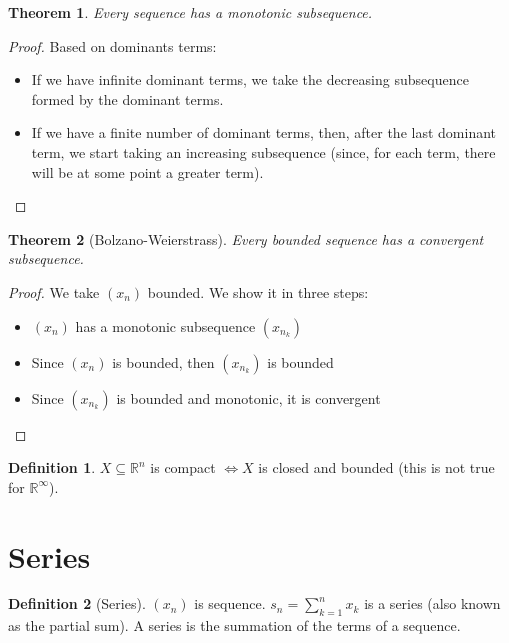 \documentclass{article}
\newcommand{\DS}{\displaystyle}
\theoremstyle{definition}
\newtheorem{definition}{Definition}[section]
\theoremstyle{definition}
\theoremstyle{plain}
\newtheorem{theorem}{Theorem}[section]
\theoremstyle{plain}
\theoremstyle{plain}
\theoremstyle{plain}
\theoremstyle{definition}
\theoremstyle{remark}
\theoremstyle{remark}
\theoremstyle{remark}
\theoremstyle{remark}
\newcommand{\R}{\mathbb{R}}
\newcommand{\sumn}{\sum_{k=1}^n}
\begin{document}
\begin{theorem}
  Every sequence has a monotonic subsequence.
\end{theorem}

\begin{proof}
  Based on dominants terms:
  \begin{itemize}
    \item If we have infinite dominant terms, we take the decreasing subsequence formed by the dominant terms.
    \item If we have a finite number of dominant terms, then, after the last dominant term, we start taking an increasing subsequence (since, for each term, there will be at some point a greater term).
  \end{itemize}
\end{proof}


\begin{theorem}[Bolzano-Weierstrass]
  Every bounded sequence has a convergent subsequence.
\end{theorem}

\begin{proof}
  We take $(x_n)$ bounded. We show it in three steps:
  \begin{itemize}
    \item $(x_n)$ has a monotonic subsequence $(x_{n_k})$
    \item Since $(x_n)$ is bounded, then $(x_{n_k})$ is bounded
    \item Since $(x_{n_k})$ is bounded and monotonic, it is convergent
  \end{itemize}
\end{proof}


\begin{definition}
  $X \subseteq \R^n$ is compact $\iff X$ is closed and bounded (this is not true for $\R^\infty$).
\end{definition}


\section{Series}


\begin{definition}[Series]
  $(x_n)$ is sequence. $\DS s_n = \sumn{x_k}$ is a series (also known as the partial sum). A series is the summation of the terms of a sequence.
\end{definition}
\end{document}
